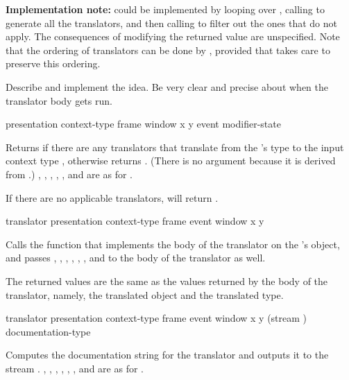 {\bf Implementation note:}  could be implemented
by looping over , calling 
to generate all the translators, and then calling 
to filter out the ones that do not apply.  The consequences of modifying the
returned value are unspecified.  Note that the ordering of translators can be
done by , provided that
 takes care to preserve this ordering.

 {Describe and implement the  idea.
Be very clear and precise about when the translator body gets run.}

 {presentation context-type frame window x y
                                            \key event modifier-state}

Returns  if there are any translators that translate from the
 's type to the input context type
, otherwise returns .  (There is no
 argument because it is derived from .)
, , , , , and
 are as for .

If there are no applicable translators, 
will return .


 {translator presentation context-type
                                       frame event window x y}

Calls the function that implements the body of the translator 
on the  's object, and passes
, , , , ,
, and  to the body of the translator as well.

The returned values are the same as the values returned by the body of the
translator, namely, the translated object and the translated type.


 {translator presentation context-type
                                           frame event window x y
                                           \key (stream ) documentation-type}

Computes the documentation string for the translator  and
outputs it to the stream .  , ,
, , , , and  are as for
.

